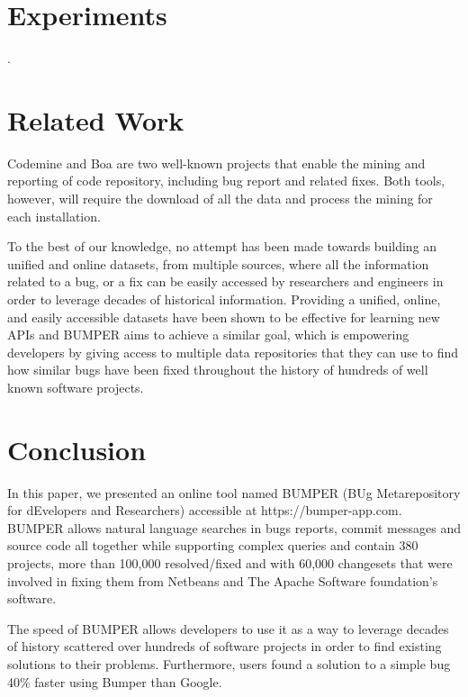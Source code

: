 \documentclass[conference]{IEEEtran}
\begin{document}
\section{Experiments}
\label{sec:Experiments}

.


\section{Related Work}
\label{sec:Related Work}

Codemine \cite{Czerwonka2013} and Boa \cite{Bizer2011} are two well-known projects that enable the mining and reporting of code repository, including bug report and related fixes.
Both tools, however, will require the download of all the data and process the mining for each installation.

To the best of our knowledge, no attempt has been made towards building an unified and online datasets, from multiple sources, where all the information related to a bug, or a fix can be easily accessed by researchers and engineers in order to leverage decades of historical information.
Providing a unified, online, and easily accessible datasets have been shown to be effective for learning new APIs\cite{Montandon2013,Rahman2013} and BUMPER aims to achieve a similar goal, which is empowering developers by giving access to multiple data repositories that they can use to find how similar bugs have been fixed throughout the history of hundreds of well known software projects.


\section{Conclusion}
\label{sec:conclusion}

In this paper, we presented an online tool named BUMPER (BUg Metarepository for dEvelopers and Researchers) accessible at https://bumper-app.com. BUMPER allows natural language searches in bugs reports, commit messages and source code all together while supporting complex queries and contain 380 projects, more than 100,000 resolved/fixed and with 60,000 changesets that were involved in fixing them from Netbeans and The Apache Software foundation’s software.

The speed of BUMPER allows developers to use it as a way to leverage decades of history scattered over hundreds of software projects in order to find existing solutions to their problems.
Furthermore, users found a solution to a simple bug 40\% faster using Bumper than Google.




\end{document}
